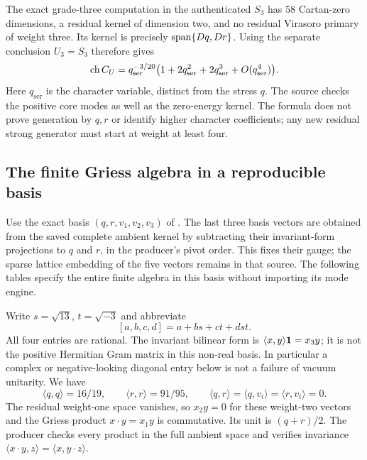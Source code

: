 The exact grade-three computation in the authenticated $S_3$ has
$58$ Cartan-zero dimensions, a residual kernel of dimension two,
and no residual Virasoro primary of weight three. Its kernel is
precisely $\operatorname{span}\{Dq,Dr\}$. Using the separate conclusion $U_3=S_3$
therefore gives
\begin{equation}
 \operatorname{ch} C_U=q_{\mathrm{ser}}^{-3/20}
 \bigl(1+2q_{\mathrm{ser}}^2+2q_{\mathrm{ser}}^3
       +O(q_{\mathrm{ser}}^4)\bigr).
 \label{expstructure:residual-character}
\end{equation}
Here $q_{\mathrm{ser}}$ is the character variable, distinct from
the stress $q$. The source
 checks
the positive core modes as well as the zero-energy kernel. The
formula does not prove generation by $q,r$ or identify higher
character coefficients; any new residual strong generator must
start at weight at least four.

\subsection{The finite Griess algebra in a reproducible basis}
\label{expstructure:griess}

Use the exact basis $(q,r,v_1,v_2,v_3)$ of
.
The last three basis vectors are obtained from the saved complete
ambient kernel by subtracting their invariant-form projections to
$q$ and $r$, in the producer's pivot order. This fixes their gauge;
the sparse lattice embedding of the five vectors remains in that
source. The following tables specify the entire finite algebra in
this basis without importing its mode engine.

Write $s=\sqrt{13}$, $t=\sqrt{-3}$ and abbreviate
\[
 [a,b,c,d]=a+bs+ct+dst.
\]
All four entries are rational. The invariant bilinear form is
$\langle x,y\rangle\mathbf1=x_3y$; it is not the positive Hermitian
Gram matrix in this non-real basis. In particular a complex or
negative-looking diagonal entry below is not a failure of vacuum
unitarity. We have
\[
\langle q,q\rangle=16/19,\qquad
\langle r,r\rangle=91/95,\qquad
\langle q,r\rangle=\langle q,v_i\rangle
 =\langle r,v_i\rangle=0.
\]
The residual weight-one space vanishes, so $x_2y=0$ for these
weight-two vectors and the Griess product $x\cdot y=x_1y$ is
commutative. Its unit is $(q+r)/2$. The producer checks every
product in the full ambient space and verifies invariance
$\langle x\cdot y,z\rangle=\langle x,y\cdot z\rangle$.

